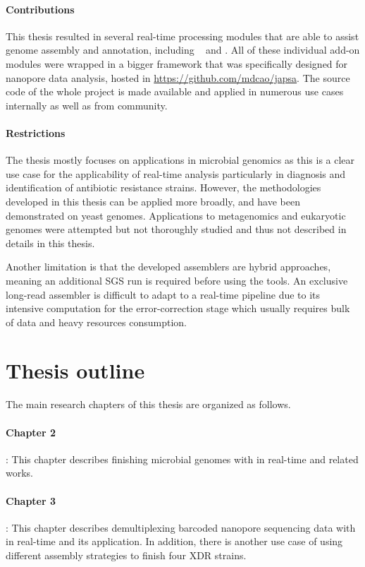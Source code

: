 \paragraph{Contributions} 
This thesis resulted in several real-time processing modules that are able to assist genome assembly and annotation, including \npscarf{}~\cite{Cao2017scaffolding} \npbarcode{}\cite{Nguyen2017barcode} and \npgraph{}. 
All of these individual add-on modules were wrapped in a bigger framework that was specifically designed for nanopore data analysis, hosted in \url{https://github.com/mdcao/japsa}.
The source code of the whole project is made available and applied in numerous use cases internally as well as from community. 

\paragraph{Restrictions}
The thesis mostly focuses on applications in microbial genomics as this is a clear use case for the applicability of real-time analysis particularly in diagnosis and identification of antibiotic resistance strains.  However, the methodologies developed in this thesis can be applied more broadly, and have been demonstrated on yeast genomes.   Applications to metagenomics and eukaryotic genomes were attempted but not thoroughly studied and thus not described in details in this thesis.

Another limitation is that the developed assemblers are hybrid approaches, meaning an additional SGS run is required before using the tools. An exclusive long-read assembler is difficult to adapt to a real-time pipeline due to its intensive computation for the error-correction stage which usually requires bulk of data and heavy resources consumption.
\section{Thesis outline}
The main research chapters of this thesis are organized as follows.
\paragraph{Chapter 2}: 
This chapter describes finishing microbial genomes with \npscarf{} in real-time and related works.
\paragraph{Chapter 3}:
This chapter describes demultiplexing barcoded nanopore sequencing data with \npbarcode{} in real-time and its application. In addition, there is another use case of using different assembly strategies to finish four XDR \kp{} strains.
